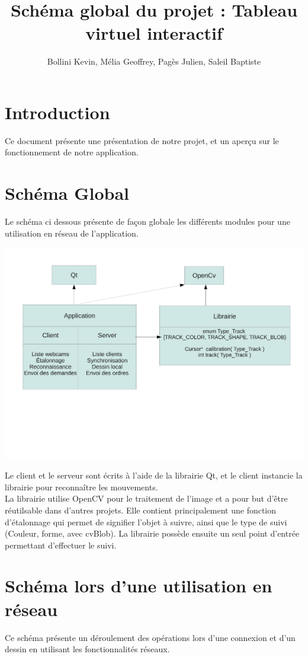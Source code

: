 \documentclass{article}
\title{Schéma global du projet : Tableau virtuel interactif}
\author{Bollini Kevin, Mélia Geoffrey, Pagès Julien, Saleil Baptiste}
\begin{document}
\maketitle

\section{Introduction}
Ce document présente une présentation de notre projet, et un aperçu sur le fonctionnement de notre application.

\section{Schéma Global}
Le schéma ci dessous présente de façon globale les différents modules pour une utilisation en réseau de l'application.
	\begin{center}
	\includegraphics[scale=0.5]{schema_global.pdf}
	\end{center}
Le client et le serveur sont écrits à l'aide de la librairie Qt, et le client instancie la librairie pour reconnaître les mouvements. \\
La librairie utilise OpenCV pour le traitement de l'image et a pour but d'être réutilsable dans d'autres projets. 
Elle contient principalement une fonction d'étalonnage qui permet de signifier l'objet à suivre, ainsi que le type de suivi (Couleur, forme, avec cvBlob). La librairie possède ensuite un seul point d'entrée permettant d'effectuer le suivi.

\section{Schéma lors d'une utilisation en réseau}
Ce schéma présente un déroulement des opérations lors d'une connexion et d'un dessin en utilisant les fonctionnalités réseaux.\\
\end{document}
